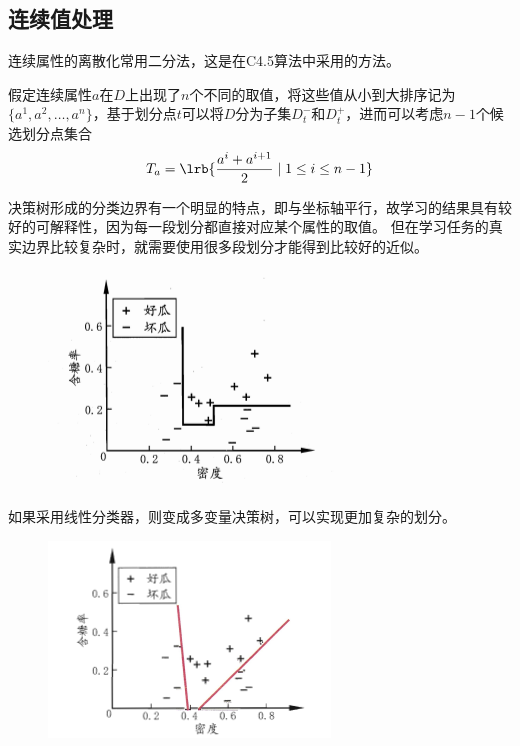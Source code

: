 \subsection{连续值处理}
连续属性的离散化常用二分法，这是在C4.5算法中采用的方法。

假定连续属性$a$在$D$上出现了$n$个不同的取值，将这些值从小到大排序记为$\{a^1,a^2,\ldots,a^n\}$，基于划分点$t$可以将$D$分为子集$D_t^-$和$D_t^+$，进而可以考虑$n-1$个候选划分点集合
\[T_a=\lrb{\frac{a^i+a^{i+1}}{2}\mid 1\leq i\leq n-1}\]

决策树形成的分类边界有一个明显的特点，即与坐标轴平行，故学习的结果具有较好的可解释性，因为每一段划分都直接对应某个属性的取值。
但在学习任务的真实边界比较复杂时，就需要使用很多段划分才能得到比较好的近似。
\begin{figure}[H]
\centering
\includegraphics[width=0.4\linewidth]{fig/DT-boundary.png}
\end{figure}

如果采用线性分类器，则变成多变量决策树，可以实现更加复杂的划分。
\begin{figure}[H]
\centering
\includegraphics[width=0.4\linewidth]{fig/multivar-DT.png}
\end{figure}